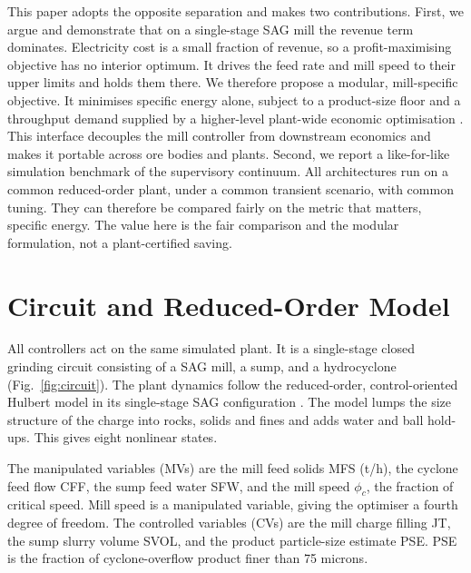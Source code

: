 \documentclass[conference]{IEEEtran}
\begin{document}
This paper adopts the opposite separation and makes two contributions.
First, we argue and demonstrate that on a single-stage SAG mill the
revenue term dominates. Electricity cost is a small fraction of revenue,
so a profit-maximising objective has no interior optimum. It drives the
feed rate and mill speed to their upper limits and holds them there. We
therefore propose a modular, mill-specific objective. It minimises
specific energy alone, subject to a product-size floor and a throughput
demand supplied by a higher-level plant-wide economic optimisation
\cite{leroux2019}. This interface decouples the mill controller from
downstream economics and makes it portable across ore bodies and plants.
Second, we report a like-for-like simulation benchmark of the supervisory
continuum. All architectures run on a common reduced-order plant, under a
common transient scenario, with common tuning. They can therefore be
compared fairly on the metric that matters, specific energy. The value
here is the fair comparison and the modular formulation, not a
plant-certified saving.

\section{Circuit and Reduced-Order Model}

All controllers act on the same simulated plant. It is a single-stage
closed grinding circuit consisting of a SAG mill, a sump, and a
hydrocyclone (Fig.~\ref{fig:circuit}). The plant dynamics follow the
reduced-order, control-oriented Hulbert model in its single-stage SAG
configuration \cite{leroux2013}. The
model lumps the size structure of the charge into rocks, solids and fines
and adds water and ball hold-ups. This gives eight nonlinear states.

The manipulated variables (MVs) are the mill feed solids MFS (t/h), the
cyclone feed flow CFF, the sump feed water SFW, and the mill speed
$\phi_c$, the fraction of critical speed. Mill speed is a manipulated
variable, giving the optimiser a fourth degree of freedom. The controlled variables (CVs) are the mill charge
filling JT, the sump slurry volume SVOL, and the product particle-size
estimate PSE. PSE is the fraction of cyclone-overflow product finer
than 75 microns.
\end{document}
